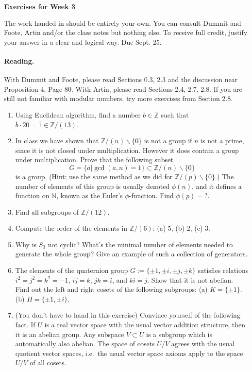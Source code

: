 \documentclass[12pt]{article}
\title{}
\date{}
\theoremstyle{plain}
\theoremstyle{definition}
\theoremstyle{remark}
\begin{document}
\begin{center}
{\Large \bf Exercises for Week 3}
\end{center}
The work handed in should be entirely your own. You can consult Dummit and Foote, Artin and/or the class notes but nothing else. To receive full credit, justify your answer in a clear and logical way. Due Sept. 25.

\paragraph{Reading.} With Dummit and Foote, please read Sections 0.3, 2.3 and the discussion near Proposition 4, Page 80. With Artin, please read Sections 2.4, 2.7, 2.8. If you are still not familiar with modular numbers, try more exercises from Section 2.8.

\begin{enumerate}
\item Using Euclidean algorithm, find a number $b\in \mathbb{Z}$ such that $\overline{b}\cdot \overline{20}=\overline{1}\in \mathbb{Z}/(13)$.
\item In class we have shown that $\mathbb{Z}/(n)\backslash\{0\}$ is not a group if $n$ is not a prime, since it is not closed under multiplication. However it does contain a group under multiplication. Prove that the following subset
    \[G=\{\overline{a}|\gcd(a, n)=1\}\subset \mathbb{Z}/(n)\backslash\{0\}\]
    is a group. (Hint: use the same method as we did for $\mathbb{Z}/(p)\backslash\{0\}$.) The number of elements of this group is usually denoted $\phi(n)$, and it defines a function on $\mathbb{N}$, known as the Euler's $\phi$-function. Find $\phi(p)=?$.
\item Find all subgroups of $\mathbb{Z}/(12)$.
\item Compute the order of the elements in $\mathbb{Z}/(6)$: (a) $\overline{5}$, (b) $\overline{2}$, (c) $\overline{3}$.
\item Why is $S_3$ not cyclic? What's the minimal number of elements needed to generate the whole group? Give an example of such a collection of generators.
\item The elements of the quaternion group $G:=\{\pm 1, \pm i, \pm j, \pm k\}$ satisfies relations $i^2=j^2=k^2=-1$, $ij=k$, $jk=i$, and $ki=j$. Show that it is not abelian. Find out the left and right cosets of the following subgroups: (a) $K=\{\pm 1 \}$. (b) $H=\{\pm1, \pm i\}$.
\item (You don't have to hand in this exercise) Convince yourself of the following fact. If $U$ is a real vector space with the usual vector addition structure, then it is an abelian group. Any subspace $V\subset U$ is a subgroup which is automatically also abelian. The space of cosets $U/V$ agrees with the usual quotient vector spaces, i.e.~the usual vector space axioms apply to the space $U/V$ of all cosets.
\end{enumerate}
\end{document}
